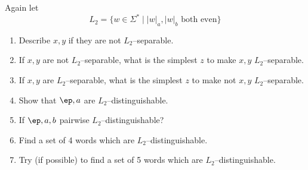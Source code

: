   Again let
  \[
  L_2 = \{w \in \Sigma^* \mid |w|_a, |w|_b \text{ both even}\}
  \]
  \begin{enumerate}[label=\textnormal{(\alph*)},itemsep=0pt,nosep,noitemsep,partopsep=0pt,topsep=0pt,parsep=0pt]
  \item Describe $x,y$ if they are not $L_2$--separable.
  \item If $x,y$ are not $L_2$--separable, what is the
    simplest $z$ to make $x,y$ $L_2$--separable.
  \item If $x,y$ are $L_2$--separable, what is the
    simplest $z$ to make not $x,y$ $L_2$--separable.
  \item Show that $\ep, a$ are $L_2$--distinguishable.
  \item If $\ep, a, b$ pairwise $L_2$--distinguishable?
  \item Find a set of 4 words which are $L_2$--distinguishable.
  \item
    Try (if possible)
    to find a set of 5 words which are $L_2$--distinguishable.  
  \end{enumerate}
